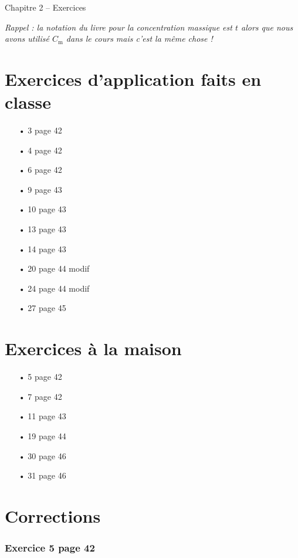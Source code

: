 \documentclass[12pt,a4paper]{article}
\begin{document}
\begin{header}
Chapitre 2 -- Exercices
\end{header}

\emph{Rappel : la notation du livre pour la concentration massique est $t$ alors que nous avons utilisé $C_\mathrm{m}$ dans le cours mais c'est la même chose !}

\section*{Exercices d'application faits en classe}

\begin{multicols}{4}
\begin{itemize}
\item[•] 3 page 42
\item[•] 4 page 42
\item[•] 6 page 42
\item[•] 9 page 43
\item[•] 10 page 43
\item[•] 13 page 43
\item[•] 14 page 43
\item[•] 20 page 44 modif
\item[•] 24 page 44 modif
\item[•] 27 page 45
\end{itemize}
\end{multicols}

\section*{Exercices à la maison}

\begin{multicols}{4}
\begin{itemize}
\item[•] 5 page 42
\item[•] 7 page 42
\item[•] 11 page 43
\item[•] 19 page 44
\item[•] 30 page 46
\item[•] 31 page 46
\end{itemize}
\end{multicols}

\section*{Corrections}

\subsubsection*{Exercice 5 page 42}
\end{document}
